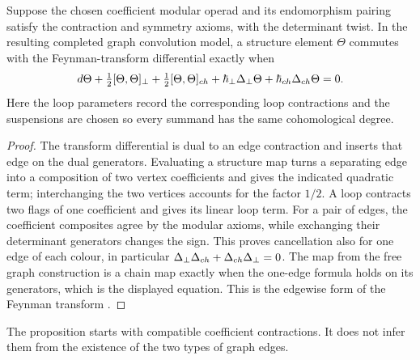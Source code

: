 \begin{proposition}
Suppose the chosen coefficient modular operad and its endomorphism pairing
satisfy the contraction and symmetry axioms, with the determinant twist.
In the resulting completed graph convolution model, a structure element $\Theta$
commutes with the Feynman-transform differential exactly when
\[
 d\Theta+\tfrac12[\Theta,\Theta]_\perp
 +\tfrac12[\Theta,\Theta]_{ch}
 +\hbar_\perp\Delta_\perp\Theta
 +\hbar_{ch}\Delta_{ch}\Theta=0.
\]
Here the loop parameters record the corresponding loop contractions and the
suspensions are chosen so every summand has the same cohomological degree.
\end{proposition}
\begin{proof}
The transform differential is dual to an edge contraction and inserts that edge on the dual generators. Evaluating a structure map turns a separating edge into a composition of two
vertex coefficients and gives the indicated quadratic term; interchanging the
two vertices accounts for the factor $1/2$. A loop contracts two flags of one
coefficient and gives its linear loop term.
For a pair of edges, the coefficient composites agree by the modular axioms,
while exchanging their determinant generators changes the sign.
This proves cancellation also for one edge of each colour, in particular
$\Delta_\perp\Delta_{ch}+\Delta_{ch}\Delta_\perp=0$.
The map from the free graph construction is a chain map exactly when the
one-edge formula holds on its generators, which is the displayed equation.
This is the edgewise form of the Feynman transform \cite{GetzlerKapranov}.
\end{proof}

The proposition starts with compatible coefficient contractions.
It does not infer them from the existence of the two types of graph edges.

